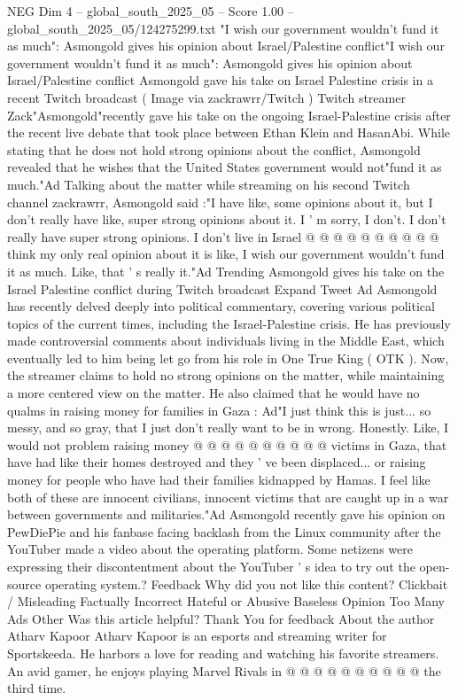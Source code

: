 \begin{textsample}{NEG Dim 4 – global\_south\_2025\_05 – Score 1.00 – global\_south\_2025\_05/124275299.txt}  \label{ex:f4_neg_362}
"I wish our government wouldn't fund it as much": Asmongold gives his opinion about Israel/Palestine conflict"I wish our government wouldn't fund it as much": Asmongold gives his opinion about Israel/Palestine conflict Asmongold gave his take on Israel Palestine crisis in a recent Twitch broadcast ( Image via zackrawrr/Twitch ) Twitch streamer Zack"Asmongold"recently gave his take on the ongoing Israel-Palestine crisis after the recent live debate that took place between Ethan Klein and HasanAbi.
While stating that he does not hold strong opinions about the conflict, Asmongold revealed that he wishes that the United States government would not"fund it as much."Ad Talking about the matter while streaming on his second Twitch channel zackrawrr, Asmongold said :"I have like, some opinions about it, but I don't really have like, super strong opinions about it.
I ' m sorry, I don't.
I don't really have super strong opinions.
I don't live in Israel @ @ @ @ @ @ @ @ @ @ think my only real opinion about it is like, I wish our government wouldn't fund it as much.
Like, that ' s really it."Ad Trending Asmongold gives his take on the Israel Palestine conflict during Twitch broadcast Expand Tweet Ad Asmongold has recently delved deeply into political commentary, covering various political topics of the current times, including the Israel-Palestine crisis.
He has previously made controversial comments about individuals living in the Middle East, which eventually led to him being let go from his role in One True King ( OTK ).
Now, the streamer claims to hold no strong opinions on the matter, while maintaining a more centered view on the matter.
He also claimed that he would have no qualms in raising money for families in Gaza : Ad"I just think this is just... so messy, and so gray, that I just don't really want to be in wrong.
Honestly.
Like, I would not problem raising money @ @ @ @ @ @ @ @ @ @ victims in Gaza, that have had like their homes destroyed and they ' ve been displaced... or raising money for people who have had their families kidnapped by Hamas.
I feel like both of these are innocent civilians, innocent victims that are caught up in a war between governments and militaries."Ad Asmongold recently gave his opinion on PewDiePie and his fanbase facing backlash from the Linux community after the YouTuber made a video about the operating platform.
Some netizens were expressing their discontentment about the YouTuber ' s idea to try out the open-source operating system.?
Feedback Why did you not like this content?
Clickbait / Misleading Factually Incorrect Hateful or Abusive Baseless Opinion Too Many Ads Other Was this article helpful?
Thank You for feedback About the author Atharv Kapoor Atharv Kapoor is an esports and streaming writer for Sportskeeda.
He harbors a love for reading and watching his favorite streamers.
An avid gamer, he enjoys playing Marvel Rivals in @ @ @ @ @ @ @ @ @ @ the third time.

\end{textsample}

